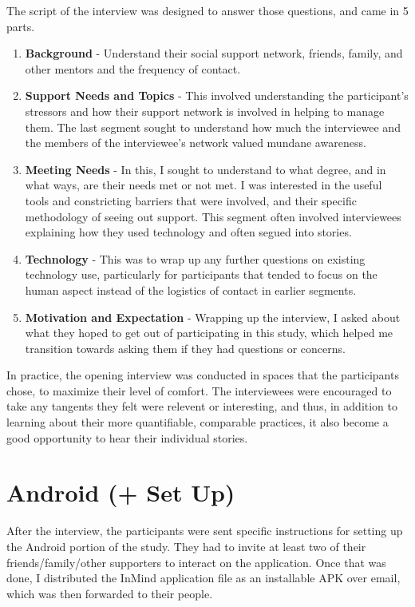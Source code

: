   The script of the interview was designed to answer those questions,
  and came in 5 parts.

  \begin{enumerate}
  \item \textbf{Background} -
    Understand their social support network,
    friends, family, and other mentors and the frequency of contact.
  \item \textbf{Support Needs and Topics} -
    This involved understanding the participant's stressors and how their
    support network is involved in helping to manage them.
    The last segment sought to understand how much the interviewee
    and the members of the interviewee's network valued
    mundane awareness.
  \item \textbf{Meeting Needs} -
    In this, I sought to understand to what degree,
    and in what ways, are their needs met or not met.
    I was interested in the useful tools and constricting barriers
    that were involved,
    and their specific methodology of seeing out support.
    This segment often involved interviewees explaining how they used technology
    and often segued into stories.
  \item \textbf{Technology} -
    This was to wrap up any further questions on existing technology use,
    particularly for participants that tended to focus on the human aspect
		instead of the logistics of contact in earlier segments.
  \item \textbf{Motivation and Expectation} - 
    Wrapping up the interview, I asked about what they hoped
		to get out of participating in this study,
    which helped me transition towards asking them if they had questions
    or concerns.
  \end{enumerate}

  In practice, the opening interview was conducted in spaces
  that the participants chose, to maximize their level of comfort.
  The interviewees were encouraged to take any tangents they felt
  were relevent or interesting, and thus,
  in addition to learning about their more quantifiable, comparable practices,
  it also become a good opportunity to hear their individual stories.

\section{Android (+ Set Up)}
  After the interview, the participants were sent specific instructions
  for setting up the Android portion of the study.
  They had to invite at least two of their friends/family/other supporters
  to interact on the application.
  Once that was done, I distributed the InMind application file as
  an installable APK over email, which was then forwarded to their people.

